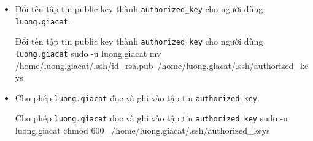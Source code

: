 \begin{itemize}[label={--}]
  \item Đổi tên tập tin public key thành \texttt{authorized\_key} cho người dùng \texttt{luong.giacat}.\\
        \begin{coding}[gobble=10]{Đổi tên tập tin public key thành \texttt{authorized\_key} cho người dùng \texttt{luong.giacat}}
          sudo -u luong.giacat mv /home/luong.giacat/.ssh/id_rsa.pub\  /home/luong.giacat/.ssh/authorized_keys
        \end{coding}

  \item Cho phép \texttt{luong.giacat} đọc và ghi vào tập tin \texttt{authorized\_key}.\\
        \begin{coding}[gobble=10]{Cho phép \texttt{luong.giacat} đọc và ghi vào tập tin \texttt{authorized\_key}}
          sudo -u luong.giacat chmod 600 \                          /home/luong.giacat/.ssh/authorized_keys
        \end{coding}
\end{itemize}



